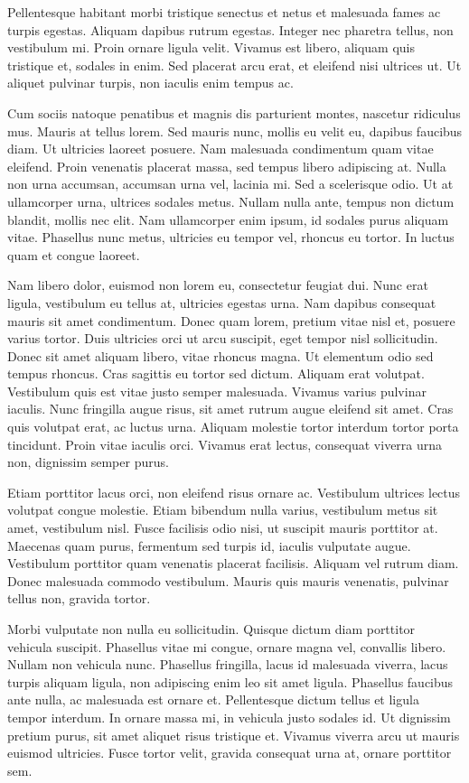 \documentclass[11pt,a4paper]{memoir}\usepackage[]{graphicx}\usepackage[]{color}
\begin{document}
Pellentesque habitant morbi tristique senectus et netus et malesuada fames ac turpis egestas. Aliquam dapibus rutrum egestas. Integer nec pharetra tellus, non vestibulum mi. Proin ornare ligula velit. Vivamus est libero, aliquam quis tristique et, sodales in enim. Sed placerat arcu erat, et eleifend nisi ultrices ut. Ut aliquet pulvinar turpis, non iaculis enim tempus ac.

Cum sociis natoque penatibus et magnis dis parturient montes, nascetur ridiculus mus. Mauris at tellus lorem. Sed mauris nunc, mollis eu velit eu, dapibus faucibus diam. Ut ultricies laoreet posuere. Nam malesuada condimentum quam vitae eleifend. Proin venenatis placerat massa, sed tempus libero adipiscing at. Nulla non urna accumsan, accumsan urna vel, lacinia mi. Sed a scelerisque odio. Ut at ullamcorper urna, ultrices sodales metus. Nullam nulla ante, tempus non dictum blandit, mollis nec elit. Nam ullamcorper enim ipsum, id sodales purus aliquam vitae. Phasellus nunc metus, ultricies eu tempor vel, rhoncus eu tortor. In luctus quam et congue laoreet.

Nam libero dolor, euismod non lorem eu, consectetur feugiat dui. Nunc erat ligula, vestibulum eu tellus at, ultricies egestas urna. Nam dapibus consequat mauris sit amet condimentum. Donec quam lorem, pretium vitae nisl et, posuere varius tortor. Duis ultricies orci ut arcu suscipit, eget tempor nisl sollicitudin. Donec sit amet aliquam libero, vitae rhoncus magna. Ut elementum odio sed tempus rhoncus. Cras sagittis eu tortor sed dictum. Aliquam erat volutpat. Vestibulum quis est vitae justo semper malesuada. Vivamus varius pulvinar iaculis. Nunc fringilla augue risus, sit amet rutrum augue eleifend sit amet. Cras quis volutpat erat, ac luctus urna. Aliquam molestie tortor interdum tortor porta tincidunt. Proin vitae iaculis orci. Vivamus erat lectus, consequat viverra urna non, dignissim semper purus.

Etiam porttitor lacus orci, non eleifend risus ornare ac. Vestibulum ultrices lectus volutpat congue molestie. Etiam bibendum nulla varius, vestibulum metus sit amet, vestibulum nisl. Fusce facilisis odio nisi, ut suscipit mauris porttitor at. Maecenas quam purus, fermentum sed turpis id, iaculis vulputate augue. Vestibulum porttitor quam venenatis placerat facilisis. Aliquam vel rutrum diam. Donec malesuada commodo vestibulum. Mauris quis mauris venenatis, pulvinar tellus non, gravida tortor.

Morbi vulputate non nulla eu sollicitudin. Quisque dictum diam porttitor vehicula suscipit. Phasellus vitae mi congue, ornare magna vel, convallis libero. Nullam non vehicula nunc. Phasellus fringilla, lacus id malesuada viverra, lacus turpis aliquam ligula, non adipiscing enim leo sit amet ligula. Phasellus faucibus ante nulla, ac malesuada est ornare et. Pellentesque dictum tellus et ligula tempor interdum. In ornare massa mi, in vehicula justo sodales id. Ut dignissim pretium purus, sit amet aliquet risus tristique et. Vivamus viverra arcu ut mauris euismod ultricies. Fusce tortor velit, gravida consequat urna at, ornare porttitor sem.
\end{document}
